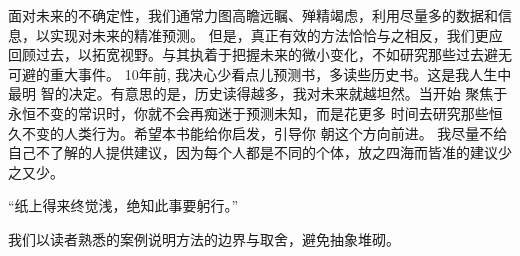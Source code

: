 %
%
%
%
%
%
面对未来的不确定性，我们通常力图高瞻远瞩、殚精竭虑，利用尽量多的数据和信息，以实现对未来的精准预测。
但是，真正有效的方法恰恰与之相反，我们更应回顾过去，以拓宽视野。与其执着于把握未来的微小变化，不如研究那些过去避无可避的重大事件。
10年前, 我决心少看点儿预测书，多读些历史书。这是我人生中最明 智的决定。有意思的是，历史读得越多，我对未来就越坦然。当开始 聚焦于永恒不变的常识时，你就不会再痴迷于预测未知，而是花更多 时间去研究那些恒久不变的人类行为。希望本书能给你启发，引导你 朝这个方向前进。
我尽量不给自己不了解的人提供建议，因为每个人都是不同的个体，放之四海而皆准的建议少之又少。

“纸上得来终觉浅，绝知此事要躬行。”


我们以读者熟悉的案例说明方法的边界与取舍，避免抽象堆砌。

\newpage
\nocite{*}

